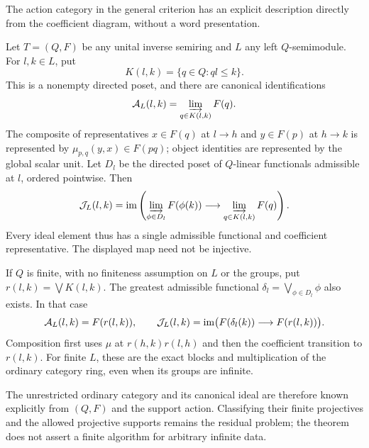 The action category in the general criterion has an explicit description
directly from the coefficient diagram, without a word presentation.
\begin{theorem}\label{thm:action-colimits}
Let $T=(Q,F)$ be any unital inverse semiring and $L$ any left
$Q$-semimodule. For $l,k\in L$, put
\[
 K(l,k)=\{q\in Q:ql\leq k\}.
\]
This is a nonempty directed poset, and there are canonical identifications
\[
 \mathcal A_L(l,k)=\varinjlim_{q\in K(l,k)}F(q).
\]
The composite of representatives $x\in F(q)$ at $l\to h$ and
$y\in F(p)$ at $h\to k$ is represented by
$\mu_{p,q}(y,x)\in F(pq)$; object identities are represented by the
global scalar unit. Let $D_l$ be the directed poset of $Q$-linear
functionals admissible at $l$, ordered pointwise. Then
\[
 \mathcal J_L(l,k)=\operatorname{im}\left(
  \varinjlim_{\phi\in D_l}F(\phi(k))
  \longrightarrow\varinjlim_{q\in K(l,k)}F(q)\right).
\]
Every ideal element thus has a single admissible functional and
coefficient representative. The displayed map need not be injective.

If $Q$ is finite, with no finiteness assumption on $L$ or the groups,
put $r(l,k)=\bigvee K(l,k)$. The greatest admissible functional
$\delta_l=\bigvee_{\phi\in D_l}\phi$ also exists. In that case
\[
 \mathcal A_L(l,k)=F(r(l,k)),\qquad
 \mathcal J_L(l,k)=
 \operatorname{im}\bigl(F(\delta_l(k))\longrightarrow F(r(l,k))\bigr).
\]
Composition first uses $\mu$ at $r(h,k)r(l,h)$ and then the coefficient
transition to $r(l,k)$. For finite $L$, these are the exact blocks and
multiplication of the ordinary category ring, even when its groups are
infinite.
\end{theorem}
The unrestricted ordinary category and its canonical ideal are therefore
known explicitly from $(Q,F)$ and the support action. Classifying their
finite projectives and the allowed projective supports remains the
residual problem; the theorem does not assert a finite algorithm for
arbitrary infinite data.

